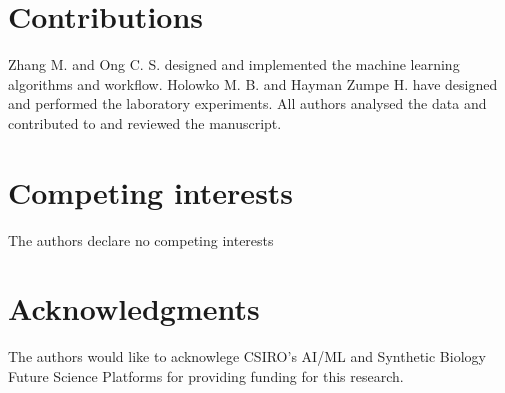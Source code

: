 \documentclass{article}
\begin{document}


\section*{Contributions}
Zhang M. and Ong C. S. designed and implemented the machine learning algorithms and workflow. Holowko M. B. and Hayman Zumpe H. have designed and performed the laboratory experiments. All authors analysed the data and contributed to and reviewed the manuscript.

\section*{Competing interests}
The authors declare no competing interests

\section*{Acknowledgments}
The authors would like to acknowlege CSIRO's AI/ML and Synthetic Biology Future Science Platforms for providing funding for this research.


\newpage

\printbibliography

\clearpage

\appendix

\end{document}
